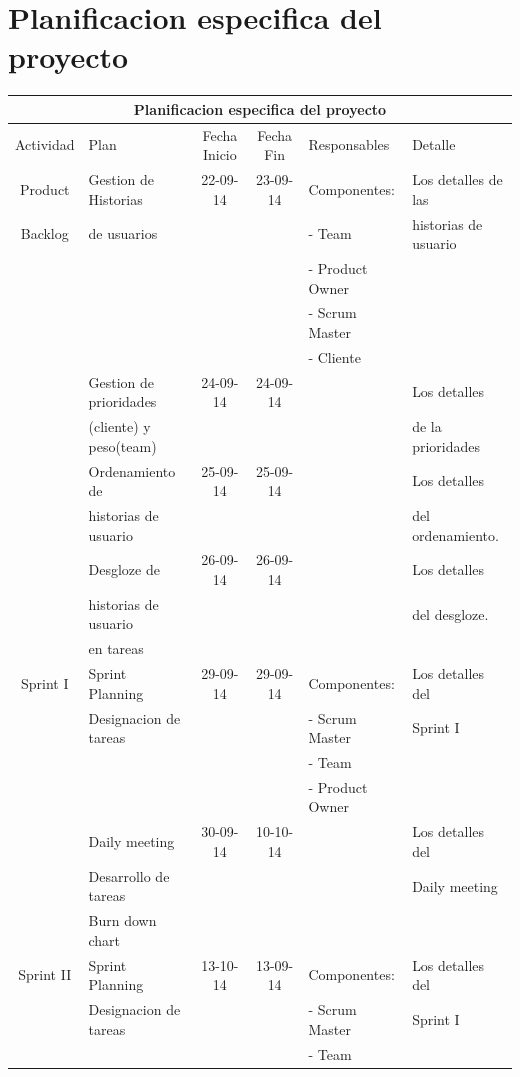 \documentclass[11pt,letterpaper]{report}
\begin{document}
\section{Planificacion especifica del proyecto}
\begin{tabular}{|c|p{4cm}|c|c|l|p{3cm}|}
	\hline
	\multicolumn{6}{|c|}{Planificacion especifica del proyecto} \\ \hline
	Actividad & Plan & Fecha Inicio & Fecha Fin & Responsables & Detalle \\ \hline
	Product & Gestion de Historias  & 22-09-14 & 23-09-14 & Componentes: & Los detalles de las \\
	Backlog & de usuarios&&& - Team & historias de usuario\\
	&&&& - Product Owner & \\
	&&&& - Scrum Master & \\
	&&&& - Cliente & \\
	\cline{2-4} \cline{6-6}
	& Gestion de prioridades& 24-09-14 & 24-09-14 && Los detalles  \\ 
	& (cliente) y peso(team)&&&&de la prioridades\\ 
	\cline{2-4} \cline{6-6}
	& Ordenamiento de & 25-09-14 & 25-09-14 && Los detalles \\
	& historias de usuario & &&& del ordenamiento. \\
	\cline{2-4} \cline{6-6}
	& Desgloze de& 26-09-14 & 26-09-14 && Los detalles \\
	& historias de usuario & &&& del desgloze. \\
	& en tareas &&&& \\
	\hline %
	Sprint I& Sprint Planning & 29-09-14 & 29-09-14 &  Componentes: & Los detalles del \\
	& Designacion de tareas &  &  & - Scrum Master & Sprint I \\
	& & & & - Team & \\
	& & & & - Product Owner & \\
	\cline{2-4} \cline{6-6}
	& Daily meeting & 30-09-14 & 10-10-14 & & Los detalles del  \\ 
	& Desarrollo de tareas &&&& Daily meeting\\
	& Burn down chart &&&& \\
	\hline %
	Sprint II& Sprint Planning & 13-10-14 & 13-09-14 &  Componentes: & Los detalles del \\
	& Designacion de tareas &  &  & - Scrum Master & Sprint I \\
	& & & & - Team & \\

\end{tabular}
\end{document}
